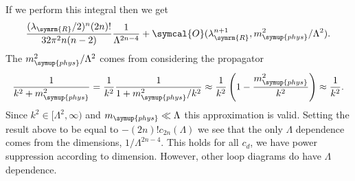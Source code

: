 \documentclass[fleqn]{NotesClass}
\newcommand{\order}{\symcal{O}}
\newcommand{\phys}{\symup{phys}}
\newcommand{\renormalised}{\symrm{R}}
\begin{document}
    If we perform this integral then we get
    \begin{equation}
        \frac{(\lambda_{\renormalised}/2)^n(2n)!}{32\pi^2n(n - 2)} \frac{1}{\Lambda^{2n - 4}} + \order(\lambda_{\renormalised}^{n+1}, m_{\phys}^2/\Lambda^2).
    \end{equation}
    The \(m_{\phys}^2/\Lambda^2\) comes from considering the propagator
    \begin{equation}
        \frac{1}{k^2 + m_{\phys}^2} = \frac{1}{k^2} \frac{1}{1 + m_{\phys}^2/k^2} \approx \frac{1}{k^2}\left( 1 - \frac{m_{\phys}^2}{k^2} \right) \approx \frac{1}{k^2}.
    \end{equation}
    Since \(k^2 \in [\Lambda^2, \infty)\) and \(m_{\phys} \ll \Lambda\) this approximation is valid.
    Setting the result above to be equal to \(-(2n)!c_{2n}(\Lambda)\) we see that the only \(\Lambda\) dependence comes from the dimensions, \(1/\Lambda^{2n - 4}\).
    This holds for all \(c_d\), we have power suppression according to dimension.
    However, other loop diagrams do have \(\Lambda\) dependence.
    
\end{document}
